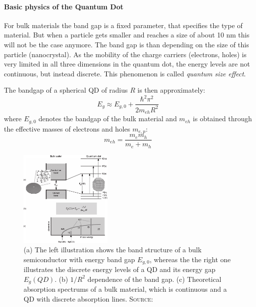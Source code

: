 	\paragraph{Basic physics of the Quantum Dot}
		For bulk materials the band gap is a fixed parameter, that specifies the type of material. But when a particle gets smaller and reaches
		a size of about 10 nm this will not be the case anymore. The band gap is than depending on the size of this particle (nanocrystal). As
		the mobility of the charge carriers (electrons, holes) is very limited in all three dimensions in the quantum dot, the energy levels
		are not continuous, but instead discrete.
		This phenomenon is called {\it quantum size effect}.
		
		The bandgap of a spherical \gls{QD} of radius $R$ is then approximately:
		\begin{equation}
			E_{g} \approx E_{g,0} + \frac{\hbar^2 \pi^2}{2 m_{eh} R^2}
			\label{eq:Bandgap}
		\end{equation}
		where $E_{g,0}$ denotes the bandgap of the bulk material and $m_{eh}$ is obtained through the effective masses of electrons and holes $m_{e,p}$:
		\begin{equation}
			m_{eh} = \frac{m_e m_h}{m_e + m_h}
			\label{eq:QuantumBox}
		\end{equation}
		
		\begin{figure}[htbp]
			\centering
			\includegraphics[width=0.4\textwidth]{Fig/QDTheory.pdf}
			\caption{(a) The left illustration shows the band structure of a bulk semiconductor with energy band gap $E_{g,0}$,
							 whereas the the right one illustrates the discrete energy levels of a \gls{QD} and its energy gap $E_{g}(QD)$.
							 (b) $1/R^2$ dependence of the band gap. (c) Theoretical absorption spectrums of a bulk material, which is continuous
							 and a \gls{QD} with discrete absorption lines.
							 {\scshape Source:} \cite[p.3]{Klimov}}
			\label{fig:QDTheory}
		\end{figure}
		
